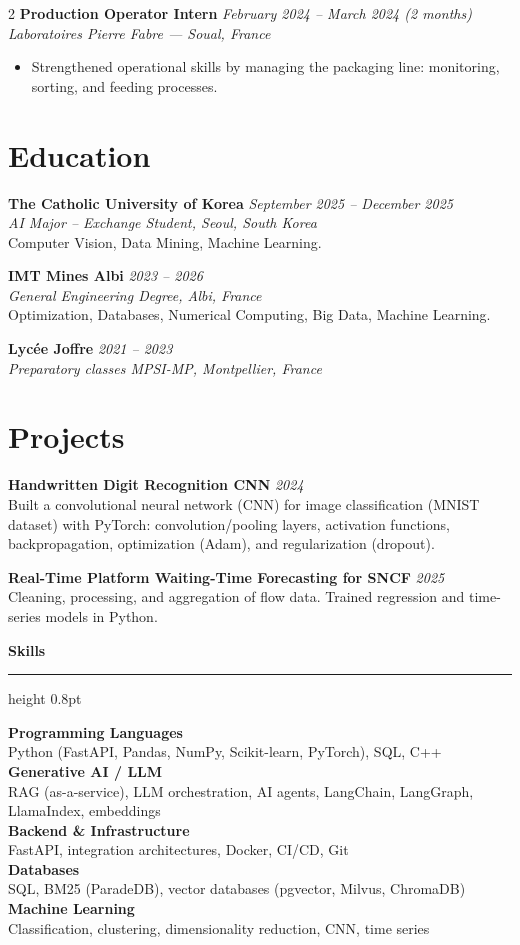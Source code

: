 \documentclass[10.5pt,a4paper]{article}
\newcommand{\sectionrule}{\vspace{-6pt}{\color{accent}\hrule height 1pt}\vspace{3pt}}
\newcommand{\subsectitle}[1]{%
  {\color{accent}\bfseries\large #1}\\[-2pt]
  {\color{accent}\hrule height 0.8pt}\vspace{4pt}
}
\newcommand{\cvexp}[5]{%
  \noindent\textbf{#1} \hfill {\itshape\color{graytext}\small #4}\\
  {\itshape #2 --- #3}\\[-6pt]
  #5
  \vspace{9pt}
}
\newcommand{\cvedu}[5]{%
  \noindent\textbf{#1} \hfill {\itshape\color{graytext}\small #4}\\
  {\itshape #2, #3}\\[1pt]
  {\small #5}
  \vspace{2pt}
}
\newcommand{\cveduplain}[4]{%
  \noindent\textbf{#1} \hfill {\itshape\color{graytext}\small #4}\\
  {\itshape #2, #3}
  \vspace{2pt}
}
\newcommand{\cvproject}[3]{%
  \noindent\textbf{#1} \hfill {\itshape\color{graytext}\small #2}\\[1pt]
  {\small #3}
  \vspace{3pt}
}
\newcommand{\sidebarline}[2]{%
  \noindent\textbf{\small #1}\\
  {\small #2}\\[3pt]
}
\begin{document}
\begin{paracol}{2}
\cvexp{Production Operator Intern}{Laboratoires Pierre Fabre}{Soual, France}{February 2024 -- March 2024 (2 months)}{%
  \begin{itemize}[leftmargin=12pt, itemsep=2pt, topsep=0pt, partopsep=0pt, parsep=0pt]
    \item Strengthened operational skills by managing the packaging line: monitoring, sorting, and feeding processes.
  \end{itemize}
}

\section*{Education}
\sectionrule

\cvedu{The Catholic University of Korea}{AI Major -- Exchange Student}{Seoul, South Korea}{September 2025 -- December 2025}{Computer Vision, Data Mining, Machine Learning.}

\cvedu{IMT Mines Albi}{General Engineering Degree}{Albi, France}{2023 -- 2026}{Optimization, Databases, Numerical Computing, Big Data, Machine Learning.}

\cveduplain{Lycée Joffre}{Preparatory classes MPSI-MP}{Montpellier, France}{2021 -- 2023}

\section*{Projects}
\sectionrule

\cvproject{Handwritten Digit Recognition CNN}{2024}{Built a convolutional neural network (CNN) for image classification (MNIST dataset) with PyTorch: convolution/\allowbreak pooling layers, activation functions, backpropagation, optimization (Adam), and regularization (dropout).}

\cvproject{Real-Time Platform Waiting-Time Forecasting for SNCF}{2025}{Cleaning, processing, and aggregation of flow data. Trained regression and time-series models in Python.}

\switchcolumn

\vspace{2pt}

\subsectitle{Skills}

\sidebarline{Programming Languages}{Python (FastAPI, Pandas, NumPy, Scikit-learn, PyTorch), SQL, C++}
\sidebarline{Generative AI / LLM}{RAG (as-a-service), LLM orchestration, AI agents, LangChain, LangGraph, LlamaIndex, embeddings}
\sidebarline{Backend \& Infrastructure}{FastAPI, integration architectures, Docker, CI/CD, Git}
\sidebarline{Databases}{SQL, BM25 (ParadeDB), vector databases (pgvector, Milvus, ChromaDB)}
\sidebarline{Machine Learning}{Classification, clustering, dimensionality reduction, CNN, time series}


\end{paracol}
\end{document}
